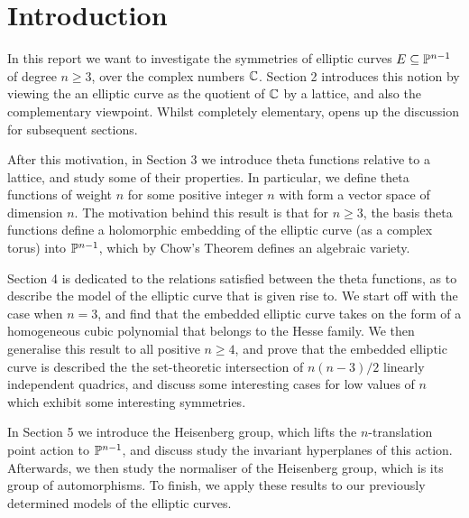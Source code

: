 \section{Introduction}

In this report we want to investigate the symmetries of elliptic curves $E \subseteq \mathbb{P}^{n-1}$ of degree $n\geq 3$, over the complex numbers $\mathbb{C}$. Section 2 introduces this notion by viewing the an elliptic curve as the quotient of $\mathbb{C}$ by a lattice, and also the complementary viewpoint. Whilst completely elementary, opens up the discussion for subsequent sections.

After this motivation, in Section 3 we introduce theta functions relative to a lattice, and study some of their properties. In particular, we define theta functions of weight $n$ for some positive integer $n$ with form a vector space of dimension $n$. The motivation behind this result is that for $n \geq 3$, the basis theta functions define a holomorphic embedding of the elliptic curve (as a complex torus) into $\mathbb{P}^{n-1}$, which by Chow's Theorem defines an algebraic variety.

Section 4 is dedicated to the relations satisfied between the theta functions, as to describe the model of the elliptic curve that is given rise to. We start off with the case when $n = 3$, and find that the embedded elliptic curve takes on the form of a homogeneous cubic polynomial that belongs to the Hesse family. We then generalise this result to all positive $n \geq 4$, and prove that the embedded elliptic curve is described the the set-theoretic intersection of $n(n-3)/2$ linearly independent quadrics, and discuss some interesting cases for low values of $n$ which exhibit some interesting symmetries.

In Section 5 we introduce the Heisenberg group, which lifts the $n$-translation point action to $\mathbb{P}^{n-1}$, and discuss study the invariant hyperplanes of this action. Afterwards, we then study the normaliser of the Heisenberg group, which is its group of automorphisms. To finish, we apply these results to our previously determined models of the elliptic curves.
